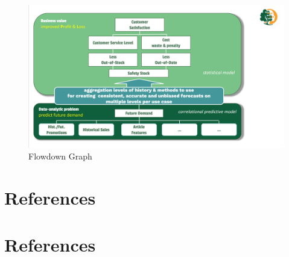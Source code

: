 \documentclass[
  american,
  10,
  a4paper,
]{book}
\theoremstyle{definition}
\theoremstyle{remark}
\begin{document}
\begin{figure}[H]

\caption{Flowdown Graph}

{\centering \includegraphics[width=1\linewidth,height=\textheight,keepaspectratio]{nb/../images/flowdown.png}

}

\end{figure}%

\chapter{References}\label{references}

\chapter*{References}\label{references-1}

\end{document}
